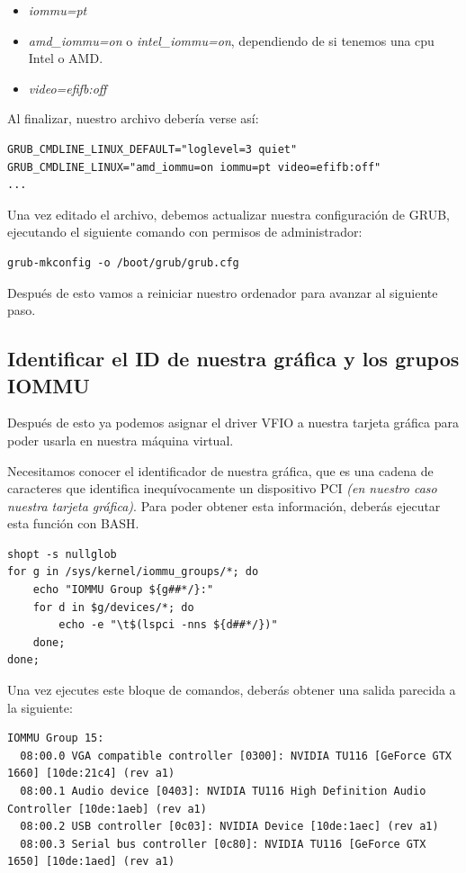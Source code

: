 \documentclass[12pt]{article}
\begin{document}
\begin{itemize}
\setlength\itemsep{-0.2em}
\item \emph{iommu=pt}
\item \emph{amd\_iommu=on} o \emph{intel\_iommu=on}, dependiendo de si tenemos una cpu Intel o AMD.
\item \emph{video=efifb:off}
\end{itemize}

Al finalizar, nuestro archivo debería verse así:

\begin{verbatim}
GRUB_CMDLINE_LINUX_DEFAULT="loglevel=3 quiet"
GRUB_CMDLINE_LINUX="amd_iommu=on iommu=pt video=efifb:off"
...
\end{verbatim}

Una vez editado el archivo, debemos actualizar nuestra configuración de GRUB, ejecutando el siguiente comando con permisos de administrador:

\begin{verbatim}
grub-mkconfig -o /boot/grub/grub.cfg
\end{verbatim}

Después de esto vamos a reiniciar nuestro ordenador para avanzar al siguiente paso.

\subsection{Identificar el ID de nuestra gráfica y los grupos IOMMU}

Después de esto ya podemos asignar el driver VFIO a nuestra tarjeta gráfica para poder usarla en nuestra máquina virtual.

Necesitamos conocer el identificador de nuestra gráfica, que es una cadena de caracteres que identifica inequívocamente un dispositivo PCI \emph{(en nuestro caso nuestra tarjeta gráfica)}. Para poder obtener esta información, deberás ejecutar esta función con BASH.

\begin{verbatim}
shopt -s nullglob
for g in /sys/kernel/iommu_groups/*; do
    echo "IOMMU Group ${g##*/}:"
    for d in $g/devices/*; do
        echo -e "\t$(lspci -nns ${d##*/})"
    done;
done;
\end{verbatim}

Una vez ejecutes este bloque de comandos, deberás obtener una salida parecida a la siguiente:

\begin{lstlisting}[basicstyle=\scriptsize\ttfamily]
IOMMU Group 15:
  08:00.0 VGA compatible controller [0300]: NVIDIA TU116 [GeForce GTX 1660] [10de:21c4] (rev a1)
  08:00.1 Audio device [0403]: NVIDIA TU116 High Definition Audio Controller [10de:1aeb] (rev a1)
  08:00.2 USB controller [0c03]: NVIDIA Device [10de:1aec] (rev a1)
  08:00.3 Serial bus controller [0c80]: NVIDIA TU116 [GeForce GTX 1650] [10de:1aed] (rev a1)
\end{lstlisting}
\end{document}
